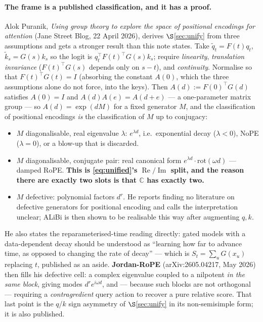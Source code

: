 \documentclass[11pt]{article}
\newcommand{\C}{\mathbb{C}}
\begin{document}
\paragraph{The frame is a published classification, and it has a proof.} Alok
Puranik, \emph{Using group theory to explore the space of positional encodings for
attention} (Jane Street Blog, 22 April 2026), derives $\S$\ref{sec:unify} from
three assumptions and gets a stronger result than this note states. Take
$\tilde q_t=F(t)q_t$, $\tilde k_s=G(s)k_s$ so the logit is $q_t^\top F(t)^\top G(s)k_s$;
require \emph{linearity}, \emph{translation invariance} ($F(t)^\top G(s)$ depends only
on $s-t$), and \emph{continuity}. Normalise so that $F(t)^\top G(t)=I$ (absorbing the constant $A(0)$, which the three assumptions alone do not force, into the keys). Then $A(d):=F(0)^\top G(d)$ satisfies $A(0)=I$ and
$A(d)A(e)=A(d+e)$ --- a one-parameter matrix group --- so $A(d)=\exp(dM)$ for a
fixed generator $M$, and the classification of positional encodings \emph{is} the
classification of $M$ up to conjugacy:
\begin{itemize}\itemsep1pt
\item $M$ diagonalisable, real eigenvalue $\lambda$: $e^{\lambda d}$, i.e.\ exponential
  decay ($\lambda<0$), NoPE ($\lambda=0$), or a blow-up that is discarded.
\item $M$ diagonalisable, conjugate pair: real canonical form
  $e^{\lambda d}\!\cdot\!\mathrm{rot}(\omega d)$ --- damped RoPE. \textbf{This is
  \eqref{eq:unified}'s $\operatorname{Re}/\operatorname{Im}$ split, and the reason
  there are exactly two slots is that $\C$ has exactly two.}
\item $M$ defective: polynomial factors $d^r$. He reports finding no literature on
  defective generators for positional encoding and calls the interpretation unclear;
  ALiBi is then shown to be realisable this way after augmenting $q,k$.
\end{itemize}
He also states the reparameterised-time reading directly: gated models with a
data-dependent decay should be understood as ``learning how far to advance time, as
opposed to changing the rate of decay'' --- which is $S_t=\sum_u G(x_u)$ replacing
$t$, published as an aside. \textbf{Jordan-RoPE} (arXiv:2605.04217, May 2026) then
fills his defective cell: a complex eigenvalue coupled to a nilpotent \emph{in the
same block}, giving modes $d^re^{i\omega d}$, and --- because such blocks are not
orthogonal --- requiring a \emph{contragredient} query action to recover a pure
relative score. That last point is the $q$/$k$ sign asymmetry of $\S$\ref{sec:unify}
in its non-semisimple form; it is also published.
\end{document}
